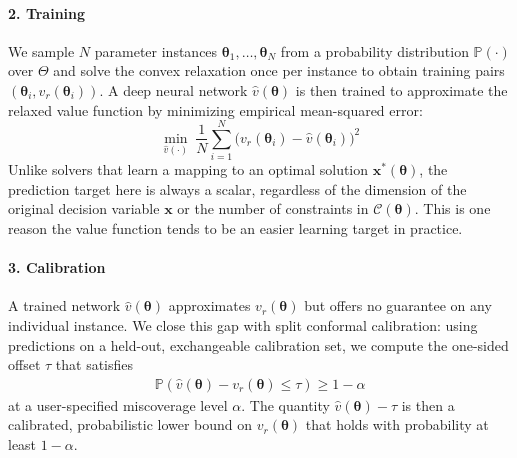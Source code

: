 \documentclass[10pt]{article} %
\theoremstyle{plain}
\theoremstyle{definition}
\theoremstyle{remark}
\begin{document}
\paragraph{2. Training} We sample $N$ parameter instances $\bm{\theta}_1, \ldots, \bm{\theta}_N$ from a probability distribution $\mathbb{P}(\cdot)$ over $\Theta$ and solve the convex relaxation once per instance to obtain training pairs $(\bm{\theta}_i, v_r(\bm{\theta}_i))$. A deep neural network $\hat{v}(\bm{\theta})$ is then trained to approximate the relaxed value function by minimizing empirical mean-squared error:
\begin{equation*}
    \min_{\hat{v}(\cdot)}~ \frac{1}{N} \sum_{i=1}^N \big(v_r(\bm{\theta}_i) - \hat{v}(\bm{\theta}_i)\big)^2
\end{equation*}
Unlike solvers that learn a mapping to an optimal solution $\mathbf{x}^*(\bm{\theta})$, the prediction target here is always a scalar, regardless of the dimension of the original decision variable $\mathbf{x}$ or the number of constraints in $\mathcal{C}(\bm{\theta})$. This is one reason the value function tends to be an easier learning target in practice.

\paragraph{3. Calibration} A trained network $\hat{v}(\bm{\theta})$ approximates $v_r(\bm{\theta})$ but offers no guarantee on any individual instance. We close this gap with split conformal calibration: using predictions on a held-out, exchangeable calibration set, we compute the one-sided offset $\tau$ that satisfies
\begin{align*}
    \mathbb{P}(\hat{v}(\bm{\theta}) - v_r(\bm{\theta}) \leq \tau ) \geq 1 - \alpha
\end{align*} at a user-specified miscoverage level $\alpha$. The quantity $\hat{v}(\bm{\theta}) - \tau$ is then a calibrated, probabilistic lower bound on $v_r(\bm{\theta})$ that holds with probability at least $1 - \alpha$.
\end{document}
